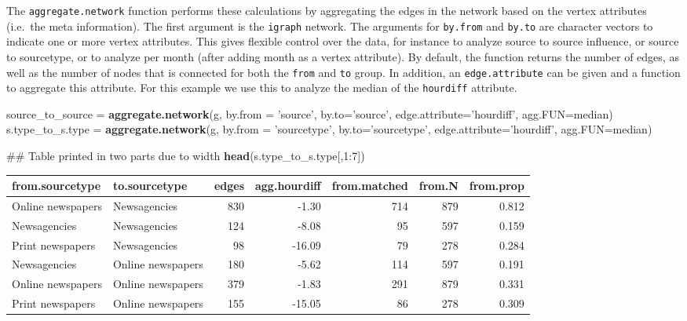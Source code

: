 \documentclass[]{article}
\newenvironment{Shaded}{\begin{snugshade}}{\end{snugshade}}
\newcommand{\KeywordTok}[1]{\textcolor[rgb]{0.13,0.29,0.53}{\textbf{{#1}}}}
\newcommand{\DataTypeTok}[1]{\textcolor[rgb]{0.13,0.29,0.53}{{#1}}}
\newcommand{\DecValTok}[1]{\textcolor[rgb]{0.00,0.00,0.81}{{#1}}}
\newcommand{\StringTok}[1]{\textcolor[rgb]{0.31,0.60,0.02}{{#1}}}
\newcommand{\NormalTok}[1]{{#1}}
\begin{document}
The \texttt{aggregate.network} function performs these calculations by
aggregating the edges in the network based on the vertex attributes
(i.e.~the meta information). The first argument is the \texttt{igraph}
network. The arguments for \texttt{by.from} and \texttt{by.to} are
character vectors to indicate one or more vertex attributes. This gives
flexible control over the data, for instance to analyze source to source
influence, or source to sourcetype, or to analyze per month (after
adding month as a vertex attribute). By default, the function returns
the number of edges, as well as the number of nodes that is connected
for both the \texttt{from} and \texttt{to} group. In addition, an
\texttt{edge.attribute} can be given and a function to aggregate this
attribute. For this example we use this to analyze the median of the
\texttt{hourdiff} attribute.

\begin{Shaded}
\begin{Highlighting}[]
\NormalTok{source_to_source =}\StringTok{ }\KeywordTok{aggregate.network}\NormalTok{(g, }\DataTypeTok{by.from =} \StringTok{'source'}\NormalTok{, }\DataTypeTok{by.to=}\StringTok{'source'}\NormalTok{, }
                                     \DataTypeTok{edge.attribute=}\StringTok{'hourdiff'}\NormalTok{, }\DataTypeTok{agg.FUN=}\NormalTok{median)}
\NormalTok{s.type_to_s.type =}\StringTok{ }\KeywordTok{aggregate.network}\NormalTok{(g, }\DataTypeTok{by.from =} \StringTok{'sourcetype'}\NormalTok{, }\DataTypeTok{by.to=}\StringTok{'sourcetype'}\NormalTok{, }
                                     \DataTypeTok{edge.attribute=}\StringTok{'hourdiff'}\NormalTok{, }\DataTypeTok{agg.FUN=}\NormalTok{median)}

\NormalTok{## Table printed in two parts due to width}
\KeywordTok{head}\NormalTok{(s.type_to_s.type[,}\DecValTok{1}\NormalTok{:}\DecValTok{7}\NormalTok{])}
\end{Highlighting}
\end{Shaded}

\begin{longtable}[c]{@{}llrrrrr@{}}
\toprule
from.sourcetype & to.sourcetype & edges & agg.hourdiff & from.matched &
from.N & from.prop\tabularnewline
\midrule
\endhead
Online newspapers & Newsagencies & 830 & -1.30 & 714 & 879 &
0.812\tabularnewline
Newsagencies & Newsagencies & 124 & -8.08 & 95 & 597 &
0.159\tabularnewline
Print newspapers & Newsagencies & 98 & -16.09 & 79 & 278 &
0.284\tabularnewline
Newsagencies & Online newspapers & 180 & -5.62 & 114 & 597 &
0.191\tabularnewline
Online newspapers & Online newspapers & 379 & -1.83 & 291 & 879 &
0.331\tabularnewline
Print newspapers & Online newspapers & 155 & -15.05 & 86 & 278 &
0.309\tabularnewline
\bottomrule
\end{longtable}
\end{document}
